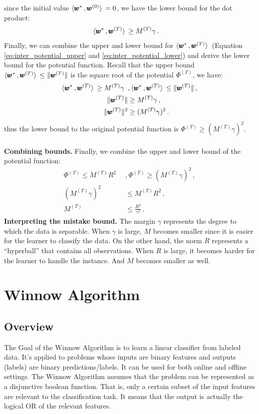 \documentclass[11pt]{article}
\begin{document}
{since the initial value $\langle  \pmb{w}^{*}  \, ,  \pmb{w}^{(0)}  \rangle\, = 0$, we have the lower bound for the dot product:
\begin{align}
    \langle  \pmb{w}^{*}  \, ,  \pmb{w}^{(T)}  \rangle\, &\ge M^{(T)} \gamma \, . \label{eq:inter_potential_lower}
\end{align}
Finally, we can combine the upper and lower bound for $\langle  \pmb{w}^{*}  \, ,  \pmb{w}^{(T)}  \rangle\,$ (Equation \ref{eq:inter_potential_upper} and \ref{eq:inter_potential_lower}) and derive the lower bound for the potential function. Recall that the upper bound $\langle  \pmb{w}^{*}  \, ,  \pmb{w}^{(T)}  \rangle\, \le \| \pmb{w}^{(T)} \|$ is the square root of the potential $\Phi^{(T)}$, we have:
\begin{align}
    \langle  \pmb{w}^{*}  \, ,  \pmb{w}^{(T)}  \rangle\, \ge M^{(T)} \gamma \,\,\, &, \langle  \pmb{w}^{*}  \, ,  \pmb{w}^{(T)}  \rangle\, \le \| \pmb{w}^{(T)} \| \, , \nonumber \\
    \| \pmb{w}^{(T)} \| &\ge M^{(T)} \gamma\, , \nonumber \\
    \| \pmb{w}^{(T)} \|^{2} &\ge (M^{(T)} \gamma)^{2}\, .
\end{align}
thus the lower bound to the original potential function is $\Phi^{(T)} \ge (M^{(T)} \gamma)^{2}$. \\ \\
%
\textbf{Combining bounds.} Finally, we combine the upper and lower bound of the potential function:
\begin{align}
   \Phi^{(T)} \le M^{(T)} R^{2} \,\,\, &, \Phi^{(T)} \ge (M^{(T)} \gamma)^{2}\,, \nonumber \\
   (M^{(T)} \gamma)^{2} &\le M^{(T)} R^{2} \, , \nonumber \\
   M^{(T)} &\le \frac{R^2}{\gamma^2} \, .
\end{align}
}
\textbf{Interpreting the mistake bound.} The margin $\gamma$ represents the degree to which the data is separable. When $\gamma$ is large, $M$ becomes smaller since it is easier for the learner to classify the data. On the other hand, the norm $R$ represents a ``hyperball'' that contains all observations. When $R$ is large, it becomes harder for the learner to handle the instance. And $M$ becomes smaller as well.
\section{Winnow Algorithm}
\subsection{Overview}
The Goal of the Winnow Algorithm is to learn a linear classifier from labeled data. It's applied to problems whose inputs are binary features and outputs (labels) are binary predictions/labels. It can be used for both online and offline settings. The Winnow Algorithm assumes that the problem can be represented as a disjunctive boolean function. That is, only a certain subset of the input features are relevant to the classification task. It means that the output is actually the logical OR of the relevant features.
\end{document}

